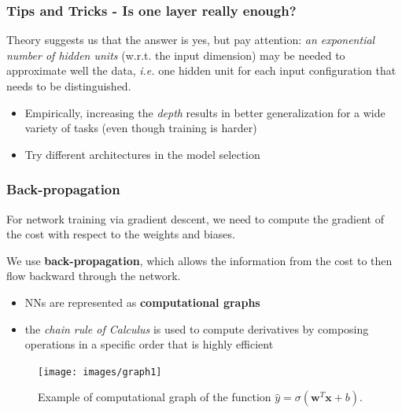 \documentclass{beamer}
\begin{document}
	\begin{frame}
		\frametitle{Tips and Tricks - Is one layer really enough?}
		Theory suggests us that the answer is yes, but pay attention: \textit{an exponential number of hidden units} (w.r.t. the input dimension) may be needed to approximate well the data, \textit{i.e.} one hidden unit for each input configuration that needs to be distinguished.
		
		\vspace{5mm}
		\begin{itemize}
			\item Empirically, increasing the \textit{depth} results in better generalization for a wide variety of tasks (even though training is harder)
			\item Try different architectures in the model selection
		\end{itemize}
		
	\end{frame}

	\begin{frame}
		\frametitle{Back-propagation}
		For network training via gradient descent, we need to compute the gradient of the cost with respect to the weights and biases.
		
		We use \textbf{back-propagation}, which allows the information from the cost to then ﬂow backward through the network.
		
		\begin{itemize}
			\item NNs are represented as \textbf{computational graphs}
			\item the \textit{chain rule of Calculus} is used to compute derivatives by composing operations in a specific order that is highly efficient
		\end{itemize}
		
		\begin{figure}
			\centering
			\texttt{[image: images/graph1]}
			\caption{Example of computational graph of the function $\hat{y} = \sigma(\bm{w}^T\bm{x}+b)$.}
		\end{figure}
	\end{frame}
\end{document}
